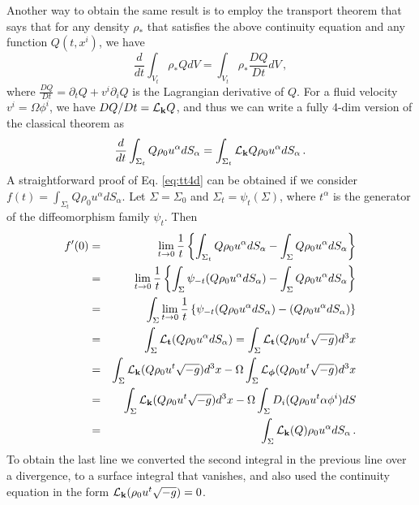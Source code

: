 \documentclass[twocolumn,superscriptaddress,showpacs,prd,aps,amsmath,amssymb,nofootinbib]{revtex4-1}
\newcommand{\GA}{\alpha}
\newcommand{\GR}{\rho}
\newcommand{\GC}{\psi}
\newcommand{\GP}{\phi}
\newcommand{\Bphi}{\boldsymbol{\phi}}
\newcommand{\pd}{\partial}
\newcommand{\be}{\begin{equation}}
\newcommand{\ee}{\end{equation}}
\begin{document}
Another way to obtain the same result is to employ the transport theorem that says that for
any density $\GR_\ast$ that satisfies the above continuity equation and any function
$Q(t,x^i)$, we have
\be
\frac{d}{dt} \int_{V_t} \GR_\ast Q dV = \int_{V_t} \GR_\ast \frac{DQ}{Dt} dV \, ,
\label{eq:tt}
\ee where $\frac{DQ}{Dt}=\pd_tQ + v^i\pd_i Q$ is the Lagrangian
derivative of $Q$.  For a fluid velocity $v^i=\Omega \phi^i$, we have
$DQ/Dt =\mathcal{L}_{\bf k}Q$, and thus we can write a fully 4-dim
version of the classical theorem as
%
\be \frac{d}{dt} \int_{\Sigma_t} Q
\GR_0 u^\GA dS_\GA = \int_{\Sigma_t} \mathcal{L}_{\bf k}Q \GR_0 u^\GA
dS_\GA \, .
\label{eq:tt4d}
\ee
%
A straightforward proof of Eq. \ref{eq:tt4d} can be obtained if we consider 
$f(t)=\int_{\Sigma_t} Q \GR_0 u^\GA dS_\GA$. Let $\Sigma=\Sigma_0$ and $\Sigma_t=\GC_t(\Sigma)$, 
where $t^\GA$ is the generator of the diffeomorphism family $\GC_t$. Then
\begin{eqnarray*}
f'(0) & = & \lim_{t\rightarrow 0} \frac{1}{t} 
\left\{ \int_{\Sigma_t} Q \GR_0 u^\GA dS_\GA  -  \int_{\Sigma} Q \GR_0 u^\GA dS_\GA\right\}  \\
& = & \lim_{t\rightarrow 0} \frac{1}{t} 
\left\{ \int_{\Sigma} \GC_{-t}(Q\GR_0 u^\GA dS_\GA)  -  \int_{\Sigma} Q \GR_0 u^\GA dS_\GA\right\}  \\
& = & \int_{\Sigma} \lim_{t\rightarrow 0}\frac{1}{t} 
\left\{\GC_{-t}(Q \GR_0 u^\GA dS_\GA)  - (Q \GR_0 u^\GA dS_\GA) \right\} \\
& = & \int_{\Sigma} \mathcal{L}_{\bf t}(Q \GR_0 u^\GA dS_\GA) =
      \int_{\Sigma} \mathcal{L}_{\bf t}(Q \GR_0 u^t \sqrt{-g}) d^3x   \\
& = & \int_{\Sigma} \mathcal{L}_{\bf{k}}(Q \GR_0 u^t \sqrt{-g}) d^3x - 
\Omega \int_{\Sigma} \mathcal{L}_{\Bphi}(Q \GR_0 u^t \sqrt{-g}) d^3x \\
& = & \int_{\Sigma} \mathcal{L}_{\bf{k}}(Q \GR_0 u^t \sqrt{-g}) d^3x - 
\Omega \int_{\Sigma} D_i(Q \GR_0 u^t \GA \GP^i) dS \\
& = & \int_{\Sigma} \mathcal{L}_{\bf{k}}(Q) \GR_0 u^\GA dS_\GA \, .
\end{eqnarray*}
%
To obtain the last line we converted the second integral in the
previous line over a divergence, to a surface integral that vanishes,
and also used the continuity equation in the form $\mathcal{L}_{\bf
  k}(\GR_0 u^t \sqrt{-g})=0$.
\end{document}
